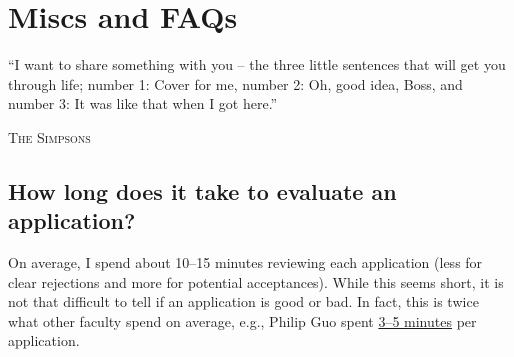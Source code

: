 \documentclass[oneside,11pt,dvipsnames]{book}
\def\sectioninfo#1{%
  \addcontentsline{toc}{sectioninfo}{%
    \noexpand\numberline{}\color{black}{#1}}%
}
\begin{document}
\chapter{Miscs and FAQs}\label{sec:faqs}

\epigraph{``I want to share something with you – the three little sentences that will get you through life; number 1: Cover for me, number 2: Oh, good idea, Boss, and number 3: It was like that when I got here.''}{\textsc{The Simpsons}}





\section{How long does it take to evaluate an application?}\label{sec:ievaluate}
\sectioninfo{It takes me about 10--15 minutes to review an application.}

On average, I spend about 10--15 minutes reviewing each application (less for clear rejections and more for potential acceptances). While this seems short, it is not that difficult to tell if an application is good or bad.  In fact, this
is twice what other faculty spend on average, e.g., Philip Guo spent \href{https://pg.ucsd.edu/PhD-application-tips.htm}{3--5 minutes} per application.
\end{document}
